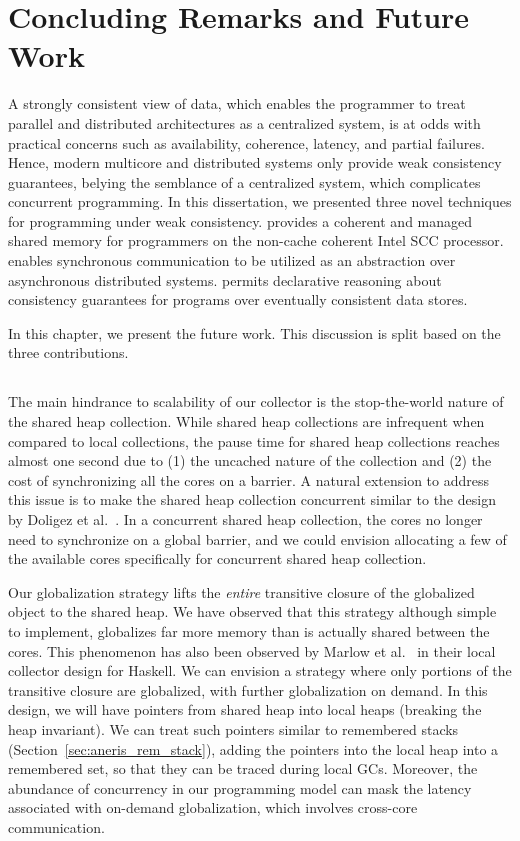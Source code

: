 \chapter{Concluding Remarks and Future Work}
\label{chap:conclusion}

A strongly consistent view of data, which enables the programmer to treat
parallel and distributed architectures as a centralized system, is at odds with
practical concerns such as availability, coherence, latency, and partial
failures. Hence, modern multicore and distributed systems only provide weak
consistency guarantees, belying the semblance of a centralized system, which
complicates concurrent programming. In this dissertation, we presented three
novel techniques for programming under weak consistency. \MMSCC provides a
coherent and managed shared memory for programmers on the non-cache coherent
Intel SCC processor. \rxcml enables synchronous communication to be utilized as
an abstraction over asynchronous distributed systems. \quelea permits
declarative reasoning about consistency guarantees for programs over eventually
consistent data stores.

In this chapter, we present the future work. This discussion is split based on
the three contributions.

\section{\MMSCC}

The main hindrance to scalability of our \MMSCC collector is the stop-the-world
nature of the shared heap collection. While shared heap collections are
infrequent when compared to local collections, the pause time for shared heap
collections reaches almost one second due to (1) the uncached nature of the
collection and (2) the cost of synchronizing all the cores on a barrier. A
natural extension to address this issue is to make the shared heap collection
concurrent similar to the design by Doligez et al.~\cite{Doligez93}. In a
concurrent shared heap collection, the cores no longer need to synchronize on a
global barrier, and we could envision allocating a few of the available cores
specifically for concurrent shared heap collection.

Our globalization strategy lifts the \emph{entire} transitive closure of the
globalized object to the shared heap. We have observed that this strategy
although simple to implement, globalizes far more memory than is actually
shared between the cores. This phenomenon has also been observed by Marlow et
al.~\cite{Marlow11} in their local collector design for Haskell. We can
envision a strategy where only portions of the transitive closure are
globalized, with further globalization on demand. In this design, we will have
pointers from shared heap into local heaps (breaking the heap invariant). We
can treat such pointers similar to remembered
stacks (Section~\ref{sec:aneris_rem_stack}), adding the pointers into the local heap
into a remembered set, so that they can be traced during local GCs. Moreover,
the abundance of concurrency in our programming model can mask the latency
associated with on-demand globalization, which involves cross-core
communication.

